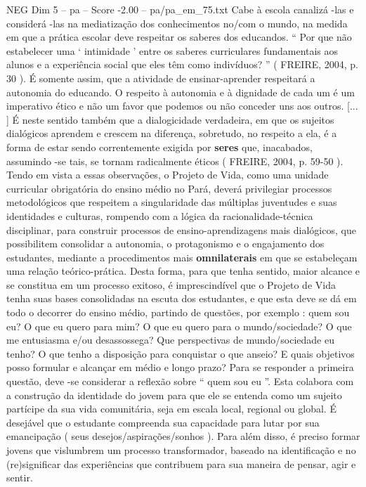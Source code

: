 \begin{textsample}{NEG Dim 5 – pa – Score -2.00 – pa/pa\_em\_75.txt}
Cabe à escola canalizá -las e considerá -las na mediatização dos conhecimentos no/com o mundo, na medida em que a prática escolar deve respeitar os saberes dos educandos. “ Por que não estabelecer uma ‘ intimidade ’ entre os saberes curriculares fundamentais aos alunos e a experiência social que eles têm como indivíduos? ” ( FREIRE, 2004, p. 30 ).
É somente assim, que a atividade de ensinar-aprender respeitará a autonomia do educando.
O respeito à autonomia e à dignidade de cada um é um imperativo ético e não um favor que podemos ou não conceder uns aos outros. [... ] É neste sentido também que a dialogicidade verdadeira, em que os sujeitos dialógicos aprendem e crescem na diferença, sobretudo, no respeito a ela, é a forma de estar sendo correntemente exigida por \textbf{seres} que, inacabados, assumindo -se tais, se tornam radicalmente éticos ( FREIRE, 2004, p. 59-50 ).
Tendo em vista a essas observações, o Projeto de Vida, como uma unidade curricular obrigatória do ensino médio no Pará, deverá privilegiar processos metodológicos que respeitem a singularidade das múltiplas juventudes e suas identidades e culturas, rompendo com a lógica da racionalidade-técnica disciplinar, para construir processos de ensino-aprendizagens mais dialógicos, que possibilitem consolidar a autonomia, o protagonismo e o engajamento dos estudantes, mediante a procedimentos mais \textbf{omnilaterais} em que se estabeleçam uma relação teórico-prática.
Desta forma, para que tenha sentido, maior alcance e se constitua em um processo exitoso, é imprescindível que o Projeto de Vida tenha suas bases consolidadas na escuta dos estudantes, e que esta deve se dá em todo o decorrer do ensino médio, partindo de questões, por exemplo : quem sou eu?
O que eu quero para mim?
O que eu quero para o mundo/sociedade?
O que me entusiasma e/ou desassossega?
Que perspectivas de mundo/sociedade eu tenho?
O que tenho a disposição para conquistar o que anseio?
E quais objetivos posso formular e alcançar em médio e longo prazo?
Para se responder a primeira questão, deve -se considerar a reflexão sobre “ quem sou eu ”.
Esta colabora com a construção da identidade do jovem para que ele se entenda como um sujeito partícipe da sua vida comunitária, seja em escala local, regional ou global.
É desejável que o estudante compreenda sua capacidade para lutar por sua emancipação ( seus desejos/aspirações/sonhos ).
Para além disso, é preciso formar jovens que vislumbrem um processo transformador, baseado na identificação e no (re)significar das experiências que contribuem para sua maneira de pensar, agir e sentir.

\end{textsample}
